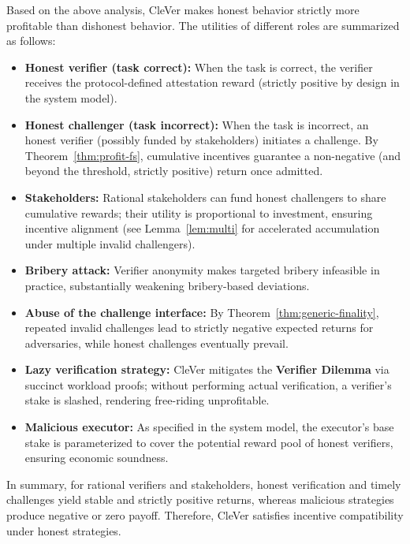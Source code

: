 \documentclass[3p]{elsarticle}
\theoremstyle{remark}
\begin{document}
Based on the above analysis, CleVer makes honest behavior strictly more profitable than dishonest behavior. The utilities of different roles are summarized as follows:

\begin{itemize}
\item \textbf{Honest verifier (task correct):} When the task is correct, the verifier receives the protocol-defined attestation reward (strictly positive by design in the system model).

\item \textbf{Honest challenger (task incorrect):} When the task is incorrect, an honest verifier (possibly funded by stakeholders) initiates a challenge. By Theorem~\ref{thm:profit-fs}, cumulative incentives guarantee a non-negative (and beyond the threshold, strictly positive) return once admitted.

\item \textbf{Stakeholders:} Rational stakeholders can fund honest challengers to share cumulative rewards; their utility is proportional to investment, ensuring incentive alignment (see Lemma~\ref{lem:multi} for accelerated accumulation under multiple invalid challengers).

\item \textbf{Bribery attack:} Verifier anonymity makes targeted bribery infeasible in practice, substantially weakening bribery-based deviations.

\item \textbf{Abuse of the challenge interface:} By Theorem~\ref{thm:generic-finality}, repeated invalid challenges lead to strictly negative expected returns for adversaries, while honest challenges eventually prevail.

\item \textbf{Lazy verification strategy:} CleVer mitigates the \textbf{Verifier Dilemma} via succinct workload proofs; without performing actual verification, a verifier’s stake is slashed, rendering free-riding unprofitable.

\item \textbf{Malicious executor:} As specified in the system model, the executor’s base stake is parameterized to cover the potential reward pool of honest verifiers, ensuring economic soundness.
\end{itemize}

\noindent In summary, for rational verifiers and stakeholders, honest verification and timely challenges yield stable and strictly positive returns, whereas malicious strategies produce negative or zero payoff. Therefore, CleVer satisfies incentive compatibility under honest strategies.
\end{document}

